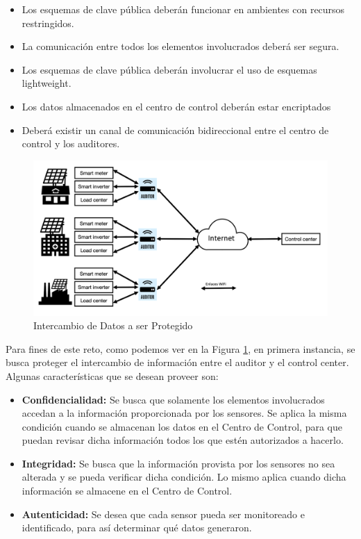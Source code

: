 \documentclass{article}
\begin{document}
            \begin{itemize}
                \item Los esquemas de clave pública deberán funcionar en ambientes con recursos restringidos.
                \item La comunicación entre todos los elementos involucrados deberá ser segura.
                \item Los esquemas de clave pública deberán involucrar el uso de esquemas lightweight.
                \item Los datos almacenados en el centro de control deberán estar encriptados
                \item Deberá existir un canal de comunicación bidireccional entre el centro de control y los auditores.
            \end{itemize}

            \begin{figure}[h]
                \centering
                \includegraphics[scale = 0.30]{img/dataExchange.png}
                \caption{Intercambio de Datos a ser Protegido}
                \label{fig:dataExchange}
            \end{figure}

            Para fines de este reto, como podemos ver en la Figura \ref{fig:dataExchange}, en primera instancia, se busca proteger el intercambio de información entre el auditor y el control center. Algunas características que se desean proveer son:
             \begin{itemize}
                \item \textbf{Confidencialidad:} Se busca que solamente los elementos involucrados accedan a la información proporcionada por los sensores. Se aplica la misma condición cuando se almacenan los datos en el Centro de Control, para que puedan revisar dicha información todos los que estén autorizados a hacerlo.
                 \item \textbf{Integridad:} Se busca que la información provista por los sensores no sea alterada y se pueda verificar dicha condición. Lo mismo aplica cuando dicha información se almacene en el Centro de Control.
                 \item \textbf{Autenticidad:} Se desea que cada sensor pueda ser monitoreado e identificado, para así determinar qué datos generaron.
             \end{itemize}
\end{document}
